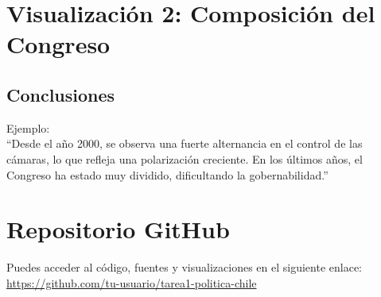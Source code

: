 \documentclass[12pt]{article}
\begin{document}
\section*{Visualización 2: Composición del Congreso}



\subsection*{Conclusiones}
Ejemplo: \\
“Desde el año 2000, se observa una fuerte alternancia en el control de las cámaras, lo que refleja una polarización creciente. En los últimos años, el Congreso ha estado muy dividido, dificultando la gobernabilidad.”

\section*{Repositorio GitHub}
Puedes acceder al código, fuentes y visualizaciones en el siguiente enlace: \\
\url{https://github.com/tu-usuario/tarea1-politica-chile} \\
\end{document}
